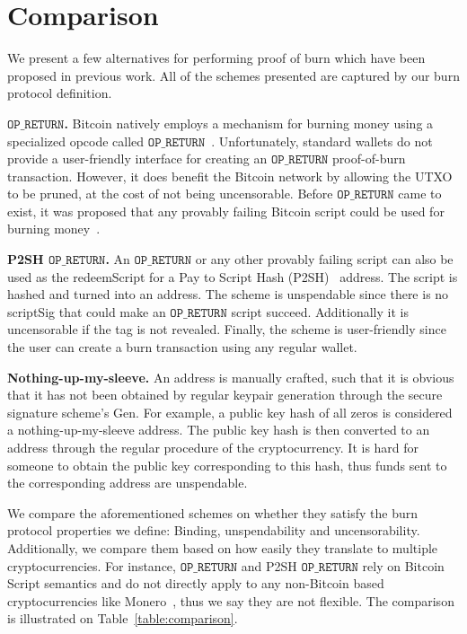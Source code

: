 \section{Comparison}

We present a few alternatives for performing proof of burn which have been proposed in previous work. All of the schemes presented are captured by our burn protocol definition.

\newcommand{\opreturn}{\texttt{OP\_RETURN}}

\noindent
\textbf{$\opreturn$.}
Bitcoin natively employs a mechanism for burning money using a specialized
opcode called $\opreturn$~\cite{bartoletti2017analysis}. Unfortunately,
standard wallets do not provide a user-friendly interface for creating an $\opreturn$ proof-of-burn transaction.
However, it does benefit the Bitcoin network by allowing the UTXO
to be pruned, at the cost of not being uncensorable.
Before $\opreturn$ came to exist, it was proposed that any provably failing Bitcoin script could be used for burning money~\cite{stewart}.

\noindent
\textbf{P2SH $\opreturn$.}
An $\opreturn$ or any other provably failing script can also be used as the redeemScript for a Pay to Script Hash (P2SH)~\cite{p2sh} address. The script is hashed and turned into an address. The scheme is unspendable since there is no scriptSig that could make an $\opreturn$ script succeed. Additionally it is uncensorable if the tag is not revealed. Finally, the scheme is user-friendly since the user can create a burn transaction using any regular wallet.

\noindent
\textbf{Nothing-up-my-sleeve.}
An address is manually crafted, such that it is obvious that it has not been obtained by regular keypair generation through the secure signature scheme's \textsf{Gen}. For example, a public key hash of all zeros is considered a nothing-up-my-sleeve address. The public key hash is then converted to an address through the regular procedure of the cryptocurrency. It is hard for someone to obtain the public key corresponding to this hash, thus funds sent to the corresponding address are unspendable.

We compare the aforementioned schemes on whether they satisfy the burn protocol properties we define: Binding, unspendability and uncensorability. Additionally, we compare them based on how easily they translate to multiple cryptocurrencies. For instance, $\opreturn$ and P2SH $\opreturn$ rely on Bitcoin Script semantics and do not directly apply to any non-Bitcoin based cryptocurrencies like Monero~\cite{van2013cryptonote}, thus we say they are not flexible. The comparison is illustrated on Table~\ref{table:comparison}.

